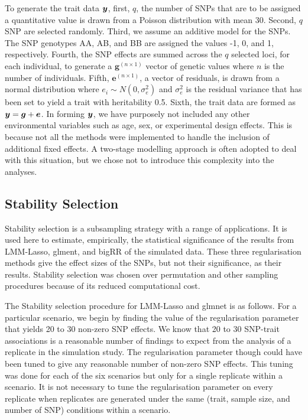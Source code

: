 \documentclass{article}
\begin{document}
To generate the trait data $\bm{y}$, first, $q$, the number of SNPs that are to be assigned a quantitative value is drawn from a Poisson distribution with 
mean 30. Second, $q$ SNP are selected randomly. Third, we assume an additive model for the SNPs. The SNP genotypes AA, AB, and BB 
are assigned the values -1, 0, and 1, respectively. Fourth, the SNP effects are summed across the $q$ selected loci, for each individual, to 
generate a $\bm{g}^{(n \times 1)}$ vector of genetic values where $n$ is the number of individuals. 
Fifth, $\bm{e}^{(n \times 1)}$, a vector of residuals, is drawn from a normal distribution where $e_i \sim N(0, \sigma^2_e)$ and $\sigma^2_e$ is 
the residual variance that has been set to yield a trait with heritability 0.5. Sixth,  the trait data are formed as $\bm{y} =  \bm{g} + \bm{e}$.  
In forming $\bm{y}$, we have purposely not included any other environmental variables such as age, sex, or experimental design effects. This is because 
not all the methods were implemented to handle the inclusion of additional fixed effects. A two-stage modelling approach 
is often adopted to deal with this situation, but we chose not to introduce this complexity into the analyses.  




\subsection{Stability Selection}

 
 
 Stability selection \citep{meinshausen2010stability}  is a subsampling strategy with a range of applications. 
 It is used here to estimate, empirically, the statistical significance of the results from LMM-Lasso, glment, and bigRR 
 of the simulated data. These three regularisation methods give the effect sizes of the SNPs, but not their significance, as their 
 results.   Stability selection was chosen over permutation and other sampling procedures because of its reduced computational cost. 
 
The Stability selection procedure for LMM-Lasso and glmnet is as follows. 
For a particular scenario, we begin by finding the value of the regularisation parameter that yields 20 to 30 non-zero SNP effects. 
We know that 20 to 30 SNP-trait associations is a reasonable number of findings to expect from the analysis of a replicate in the simulation study.  The regularisation parameter though could have been tuned to give any reasonable number of non-zero SNP effects. 
 This tuning was done for each of the six scenarios 
 but only for a single replicate within a scenario. It is not necessary to tune the regularisation parameter on every replicate 
 when replicates are generated under the same (trait, sample size, and number of SNP) conditions within a scenario. 
 
\end{document}
